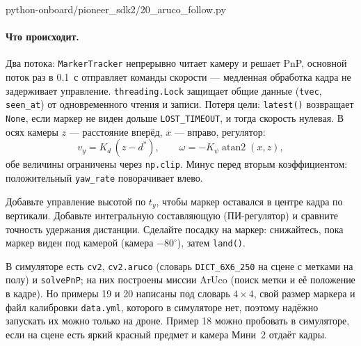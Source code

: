 \begin{codefile}[python]{python-onboard/pioneer_sdk2/20_aruco_follow.py}
\end{codefile}

\paragraph{Что происходит.} Два потока: \verb|MarkerTracker| непрерывно читает камеру и решает PnP, основной поток раз в 0.1~с отправляет команды скорости --- медленная обработка кадра не задерживает управление. \verb|threading.Lock| защищает общие данные (\verb|tvec|, \verb|seen_at|) от одновременного чтения и записи. Потеря цели: \verb|latest()| возвращает \verb|None|, если маркер не виден дольше \verb|LOST_TIMEOUT|, и тогда скорость нулевая. В осях камеры $z$ --- расстояние вперёд, $x$ --- вправо, регулятор:
\[ v_y = K_d\,(z - d^{*}),\qquad \omega = -K_\psi \operatorname{atan2}(x, z), \]
обе величины ограничены через \verb|np.clip|. Минус перед вторым коэффициентом: положительный \verb|yaw_rate| поворачивает влево.

\begin{taskbox}
Добавьте управление высотой по $t_y$, чтобы маркер оставался в центре кадра по вертикали. Добавьте интегральную составляющую (ПИ-регулятор) и сравните точность удержания дистанции. Сделайте посадку на маркер: снижайтесь, пока маркер виден под камерой (камера $-80^\circ$), затем \verb|land()|.
\end{taskbox}

\begin{infobox}
В симуляторе есть \verb|cv2|, \verb|cv2.aruco| (словарь \texttt{DICT\_6X6\_250} на сцене с метками на полу) и \verb|solvePnP|; на них построены миссии ArUco (поиск метки и её положение в кадре). Но примеры 19 и 20 написаны под словарь $4\times4$, свой размер маркера и файл калибровки \texttt{data.yml}, которого в симуляторе нет, поэтому надёжно запускать их можно только на дроне. Пример 18 можно пробовать в симуляторе, если на сцене есть яркий красный предмет и камера Мини~2 отдаёт кадры.
\end{infobox}
